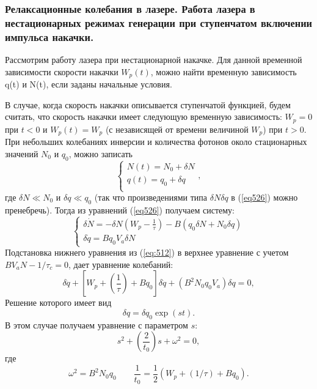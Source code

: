 \documentclass[a4paper, 12pt]{article}
\begin{document}
	\subsubsection{Релаксационные колебания в лазере. Работа лазера в нестационарных режимах генерации при ступенчатом включении импульса накачки.}
	Рассмотрим работу лазера при нестационарной накачке. Для данной временной зависимости скорости накачки $W_p(t)$, можно найти временную зависимость q(t) и N(t), если заданы начальные условия.\par
	В случае, когда скорость накачки описывается ступенчатой функцией, будем считать, что скорость накачки имеет следующую временную зависимость: $W_p=0$ при $t<0$ и $W_p(t)=W_p$ (с независящей от времени величиной $W_p$) при $t>0$. При  небольших колебаниях инверсии и количества фотонов около стационарных значений $N_0$ и $q_0$, можно записать
	\begin{equation}
		\begin{cases}
			N(t)=N_0+\delta N\\
			q(t)=q_0+\delta q\\
		\end{cases},
	\end{equation}
	где $\delta N\ll N_0$ и $\delta q\ll q_0$ (так что произведениями типа $\delta N\delta q$ в (\ref{eq526}) можно пренебречь). Тогда из уравнений (\ref{eq526}) получаем систему:
	\begin{equation}
		\begin{cases}
			\delta\dot{N}=-\delta N\left(W_p-\frac{1}{\tau}\right)-B\left(q_0\delta N+N_0\delta q\right)\\
			\delta\dot{q}=Bq_0V_a\delta N
		\end{cases}
		\label{eq:512}
	\end{equation}
	Подстановка нижнего уравнения из (\ref{eq:512}) в верхнее уравнение с учетом $BV_aN-1/\tau_c=0$, дает уравнение колебаний:
	\begin{equation}
		\delta \ddot{q}+\left[W_p+\left(\frac{1}{\tau}\right)+Bq_0\right]\delta\dot{q}+(B^2N_0q_0V_a)\delta q = 0,
	\end{equation}
	Решение которого имеет вид
	\begin{equation*}
		\delta q=\delta q_0\exp(st).
	\end{equation*}
	В этом случае получаем уравнение с параметром $s$:
	\begin{equation*}
		s^2+\left(\frac{2}{t_0}\right)s+\omega^2=0,
	\end{equation*}
	где
	\begin{equation*}
		\omega^2=B^2N_0q_0\qquad\frac{1}{t_0}=\frac{1}{2}\left(W_p+(1/\tau)+Bq_0\right).
	\end{equation*}
\end{document}
